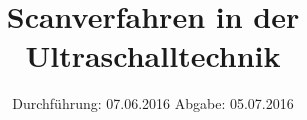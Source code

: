 
\subject{US2}
\title{Scanverfahren in der Ultraschalltechnik}
\date{
  Durchführung: 07.06.2016
  \hspace{3em}
  Abgabe: 05.07.2016
}



\maketitle
\newpage
\mbox{}
\newpage
\thispagestyle{empty}
\tableofcontents
\newpage






\nocite{numpy}
\nocite{matplotlib}
\nocite{uncertainties}
\printbibliography


